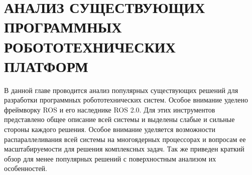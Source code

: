 \chapter{АНАЛИЗ СУЩЕСТВУЮЩИХ ПРОГРАММНЫХ РОБОТОТЕХНИЧЕСКИХ ПЛАТФОРМ}

В данной главе проводится анализ популярных существующих решений для разработки программных робототехнических систем. Особое внимание уделено фреймворку ROS и его наследнике ROS 2.0. Для этих инструментов представлено общее описание всей системы и выделены слабые и сильные стороны каждого решения. Особое внимание уделяется возможности распараллеливания всей системы на многоядерных процессорах и вопросам ее масштабируемости для решения комплексных задач. Так же приведен краткий обзор для менее популярных решений с поверхностным анализом их особенностей.








